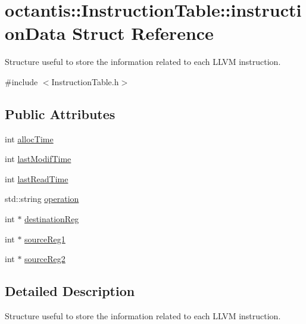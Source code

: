 \hypertarget{structoctantis_1_1InstructionTable_1_1instructionData}{}\section{octantis\+:\+:Instruction\+Table\+:\+:instruction\+Data Struct Reference}
\label{structoctantis_1_1InstructionTable_1_1instructionData}


Structure useful to store the information related to each L\+L\+VM instruction.  




{\ttfamily \#include $<$Instruction\+Table.\+h$>$}

\subsection*{Public Attributes}
\begin{DoxyCompactItemize}
\item 
int \hyperlink{structoctantis_1_1InstructionTable_1_1instructionData_a5e641a852a8bdc2b775a30f849afb12e}{alloc\+Time}
\item 
int \hyperlink{structoctantis_1_1InstructionTable_1_1instructionData_af993053e2f18ae87a70eb219aea1af19}{last\+Modif\+Time}
\item 
int \hyperlink{structoctantis_1_1InstructionTable_1_1instructionData_a73d6cd787cae3eb7b42f8dc11ad1e586}{last\+Read\+Time}
\item 
std\+::string \hyperlink{structoctantis_1_1InstructionTable_1_1instructionData_aa7ef189796e618fc6e542f3d2f6cda23}{operation}
\item 
int $\ast$ \hyperlink{structoctantis_1_1InstructionTable_1_1instructionData_ada2bd562108d8a6c69ebe2067d128e2a}{destination\+Reg}
\item 
int $\ast$ \hyperlink{structoctantis_1_1InstructionTable_1_1instructionData_a8d43f16efae0ba3ee3c6f4a8863b5eb2}{source\+Reg1}
\item 
int $\ast$ \hyperlink{structoctantis_1_1InstructionTable_1_1instructionData_a7ad5fad9cd4cf3606b25a000f91c30c0}{source\+Reg2}
\end{DoxyCompactItemize}


\subsection{Detailed Description}
Structure useful to store the information related to each L\+L\+VM instruction. 

